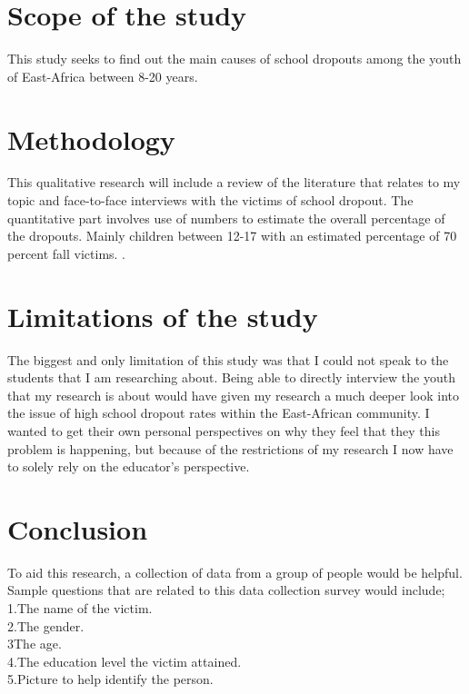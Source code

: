 \documentclass[10pt,letterpaper]{article}
\begin{document}
\section{Scope of the study}
This study seeks to find out the main causes of school dropouts among the youth of East-Africa between 8-20 years. 
\section{Methodology}
This qualitative research will include a review of the literature that relates to my topic and face-to-face interviews with the victims of school dropout. 
The quantitative part involves use of numbers to estimate the overall percentage of the dropouts. Mainly children between 12-17 with an estimated percentage of 70 percent fall victims.
.
\section{Limitations of the study}
The biggest and only limitation of this study was that I could not speak to the students that I am researching about. Being able to directly interview the youth that my research is about would have given my research a much deeper look into the issue of high school dropout rates within the East-African community. I wanted to get their own personal perspectives on why they feel that they this problem is happening, but because of the restrictions of my research I now have to solely rely on the educator’s perspective.
\section{Conclusion }
To aid this research, a collection of data from a group of people would be helpful. Sample questions that are related to this data collection survey would include;
1.The name of the victim.\\
2.The gender.\\
3The age.\\
4.The education level the victim attained.\\
5.Picture to help identify the person.\\
\end{document}
